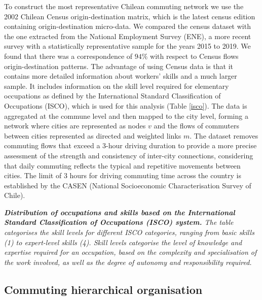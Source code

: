 \documentclass[11pt, a4paper]{article}
\begin{document}
To construct the most representative Chilean commuting network we use the 2002 Chilean Census origin-destination matrix, which is the latest census edition containing origin-destination micro-data. We compared the census dataset with the one extracted from the National Employment Survey (ENE), a more recent survey with a statistically representative sample for the years 2015 to 2019. We found that there was a correspondence of $94\%$ with respect to Census flows origin-destination patterns. The advantage of using Census data is that it contains more detailed information about workers' skills and a much larger sample. It includes information on the skill level required for elementary occupations as defined by the International Standard Classification of Occupations (ISCO), which is used for this analysis (Table \ref{isco}). The data is aggregated at the commune level and then mapped to the city level, forming a network where cities are represented as nodes $v$ and the flows of commuters between cities represented as directed and weighted links $m$. The dataset removes commuting flows that exceed a 3-hour driving duration to provide a more precise assessment of the strength and consistency of inter-city connections, considering that daily commuting reflects the typical and repetitive movements between cities. The limit of 3 hours for driving commuting time across the country is established by the CASEN (National Socioeconomic Characterisation Survey of Chile).

\begin{table}
\centering
{}
\caption{\textit{\textbf{Distribution of occupations and skills based on the International Standard Classification of Occupations (ISCO) system. } The table categorises the skill levels for different ISCO categories, ranging from basic skills (1)  to expert-level skills (4). Skill levels categorise the level of knowledge and expertise required for an occupation, based on the complexity and specialisation of the work involved, as well as the degree of autonomy and responsibility required.}}
\label{isco}
\end{table}

\subsection{Commuting hierarchical organisation}
\end{document}
